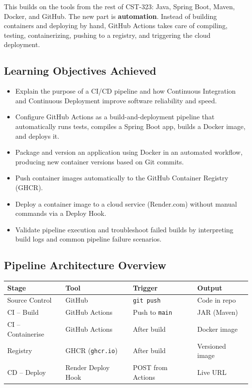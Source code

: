 \documentclass[11pt,letterpaper]{article}
\begin{document}
This builds on the tools from the rest of CST-323: Java, Spring Boot, Maven, Docker, and GitHub. The new part is \textbf{automation}. Instead of building containers and deploying by hand, GitHub Actions takes care of compiling, testing, containerizing, pushing to a registry, and triggering the cloud deployment.

\subsection{Learning Objectives Achieved}

\begin{itemize}[nosep]
  \item Explain the purpose of a CI/CD pipeline and how Continuous Integration and Continuous Deployment improve software reliability and speed.
  \item Configure GitHub Actions as a build-and-deployment pipeline that automatically runs tests, compiles a Spring Boot app, builds a Docker image, and deploys it.
  \item Package and version an application using Docker in an automated workflow, producing new container versions based on Git commits.
  \item Push container images automatically to the GitHub Container Registry (GHCR).
  \item Deploy a container image to a cloud service (Render.com) without manual commands via a Deploy Hook.
  \item Validate pipeline execution and troubleshoot failed builds by interpreting build logs and common pipeline failure scenarios.
\end{itemize}

\subsection{Pipeline Architecture Overview}

\begin{center}
\begin{tabular}{llll}
\toprule
\textbf{Stage} & \textbf{Tool} & \textbf{Trigger} & \textbf{Output} \\
\midrule
Source Control   & GitHub                & \texttt{git push}       & Code in repo \\
CI -- Build      & GitHub Actions        & Push to \texttt{main}   & JAR (Maven) \\
CI -- Containerise & GitHub Actions      & After build             & Docker image \\
Registry         & GHCR (\texttt{ghcr.io}) & After build           & Versioned image \\
CD -- Deploy     & Render Deploy Hook    & POST from Actions       & Live URL \\
\bottomrule
\end{tabular}
\end{center}
\end{document}

